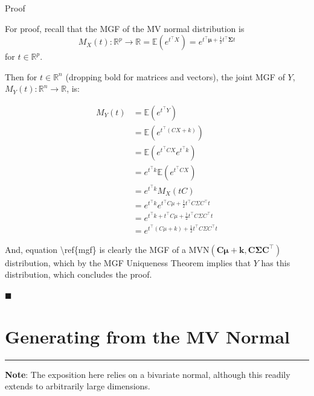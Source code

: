 \documentclass[
]{article}
\begin{document}
Proof

\leavevmode\hypertarget{MGF}{}%
For proof, recall that the MGF of the MV normal distribution is
\[M_X(t): \mathbb{R}^p \rightarrow \mathbb{R}= \mathbb{E}(e^{t^\top X}) = e^{t^\top \boldsymbol{\mu }+ \frac{1}{2}t^\top \boldsymbol{\Sigma }t}\]
for \(t \in \mathbb{R}^p\).

Then for \(t \in \mathbb{R}^n\) (dropping bold for matrices and
vectors), the joint MGF of \(Y\),
\(M_Y(t): \mathbb{R}^n \rightarrow \mathbb{R}\), is:

\begin{align}
M_Y(t) &= \mathbb{E}(e^{t^\top Y}) \\[2ex]
       &= \mathbb{E}\left(e^{t^\top(CX + k)}\right) \nonumber \\[2ex]
&=  \mathbb{E}\left(e^{t^\top CX}e^{t^\top k}\right) \nonumber \\[2ex]
&= e^{t^\top k}\mathbb{E}\left(e^{t^\top CX}\right) \nonumber \\[2ex]
&= e^{t^\top k} M_X(tC) \nonumber \\[2ex]
&= e^{t^\top k} e^{t^\top C \mu + \frac{1}{2}t^\top C \Sigma C^\top t} \nonumber \\[2ex]
&= e^{ t^\top k + t^\top C \mu  + \frac{1}{2}t^\top C \Sigma C^\top t} \nonumber \\[2ex]
&= e^{t^\top (C \mu + k) + \frac{1}{2}t^\top C \Sigma C^\top t} \label{mgf}
\end{align}

And, equation \textbackslash ref\{mgf\} is clearly the MGF of a
\(\mathrm{MVN}(\boldsymbol{C\mu + k}, \boldsymbol{C\Sigma C^\top})\)
distribution, which by the MGF Uniqueness Theorem implies that \(Y\) has
this distribution, which concludes the proof.

{\(\blacksquare\)}

\hfill\break

\hypertarget{generating-from-the-mv-normal}{%
\section{Generating from the MV
Normal}\label{generating-from-the-mv-normal}}

\begin{center}\rule{0.5\linewidth}{0.5pt}\end{center}

\textbf{Note}: The exposition here relies on a bivariate normal,
although this readily extends to arbitrarily large dimensions.
\end{document}
